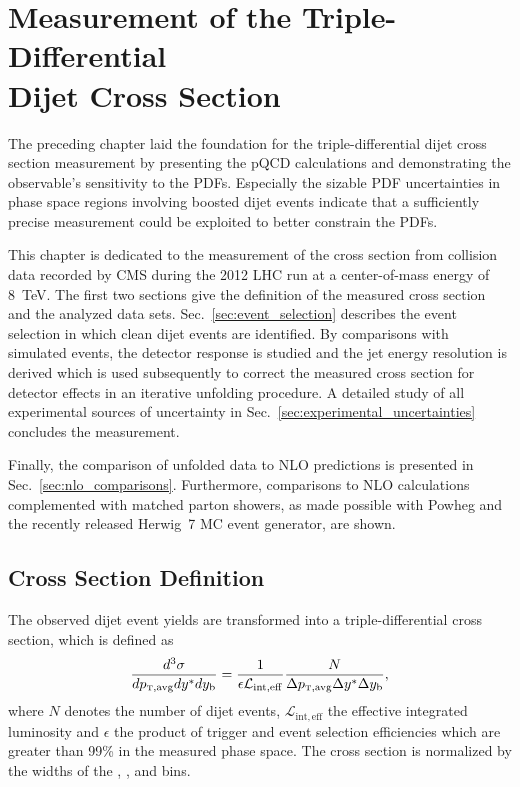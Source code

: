 
\chapter[Measurement of the Triple-Differential Dijet Cross Section]{Measurement
of the Triple-Differential\\ Dijet Cross Section}
\label{sec:measurement}

The preceding chapter laid the foundation for the triple-differential dijet
cross section measurement by presenting the pQCD calculations and
demonstrating the observable's sensitivity to the PDFs. Especially the sizable
PDF uncertainties in phase space regions involving boosted dijet events indicate
that a sufficiently precise measurement could be exploited to better constrain
the PDFs. 

This chapter is dedicated to the measurement of the cross section from collision
data recorded by CMS during the 2012 LHC run at a center-of-mass energy of
\SI{8}{\TeV}. The first two sections give the definition of the measured cross
section and the analyzed data sets. Sec.~\ref{sec:event_selection} describes the
event selection in which clean dijet events are identified. By comparisons with simulated
events, the detector response is studied and the jet energy resolution is derived
which is used subsequently to correct the measured cross section for detector
effects in an iterative unfolding procedure. A detailed study of all
experimental sources of uncertainty in Sec.~\ref{sec:experimental_uncertainties}
concludes the measurement.

Finally, the comparison of unfolded data to NLO predictions is presented in
Sec.~\ref{sec:nlo_comparisons}. Furthermore, comparisons to NLO calculations
complemented with matched parton showers, as made possible with Powheg and the
recently released Herwig~7 MC event generator, are shown.

\section{Cross Section Definition}

The observed dijet event yields are transformed into a triple-differential
cross section, which is defined as
%
\begin{equation*}
    \frac{d^3 \sigma}{d \ptavg d \ystar d \yboost} = \frac{1}{\epsilon
        \mathcal{L}_{\mathrm{int, eff}}} \frac{N}{\Delta \ptavg \Delta \ystar
        \Delta \yboost},
\end{equation*}
%
where $N$ denotes the number of dijet events, $\mathcal{L}_{\mathrm{int, eff}}$
the effective integrated luminosity and $\epsilon$ the product of trigger and
event selection efficiencies which are greater than 99\% in the measured phase
space. The cross section is normalized by the widths of the \ptavg, \ystar, and
\yboost bins. 


